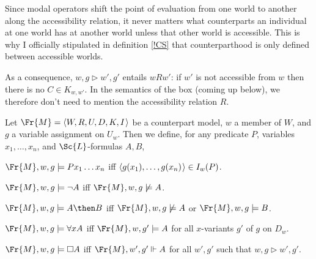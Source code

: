 \documentclass[11pt]{woarticle}
\newcommand{\cmnt}[1]{\iffalse #1 \fi}
\theoremstyle{break}
\theoremstyle{nonumberplain}
\newcommand{\SAT}{\Vdash}
\newcommand{\Img}{\triangleright}
\newcommand{\1}{\;\,|\;\,}
\renewcommand{\t}[1]{\ensuremath{\langle #1  \makebox[.2ex]{}\rangle}}
\begin{document}
\cmnt{%
  Remember that even if no member of $U_w$ has any counterpart at $w'$,
  $K_{w,w'}$ isn't empty: it still contains the empty set. Consequently, there
  will still be a $w'$-image of $V$ at $w$, namely the ``empty'' interpretation
  $V'$ with $V'_{w'}(x)$ undefined for all $x$. This is important e.g.\ for the
  interpretation of $\Box \neg Fx$ or $\Box p$.%
} %

Since modal operators shift the point of evaluation from one world to another
along the accessibility relation, it never matters what counterparts an
individual at one world has at another world unless that other world is
accessible. This is why I officially stipulated in definition \ref{!CS} that
counterparthood is only defined between accessible worlds.

As a consequence, $w,g \Img w',g'$ entails $wRw'$: if $w'$ is not accessible
from $w$ then there is no $C \in K_{w,w'}$. \label{Rredundant} In the semantics
of the box (coming up below), we therefore don't need to mention the
accessibility relation $R$.



\begin{definition}[Satisfaction]{\label{!SAT}}
  Let $\Fr{M} = \t{W,R,U,D,K,I}$ be a counterpart model, $w$ a member of $W$, and
  $g$ a variable assignment on $U_{w}$. Then we define, for any predicate $P$, variables $x_{1},\ldots,x_{n}$, and $\Sc{L}$-formulas $A,B$,
  \begin{semantics}
    \item[$\Fr{M},w,g \models Px_1\ldots x_n$] iff
    $\t{g(x_1),\ldots,g(x_n)} \in I_w(P)$.
    \item[$\Fr{M},w,g \models \neg A$] iff $\Fr{M},w,g \not\models A$.
    \item[$\Fr{M},w,g \models A \then B$] iff $\Fr{M},w,g \not\models A$ or $\Fr{M},w,g \models B$.
    \item[$\Fr{M},w,g \models \forall x A$] iff $\Fr{M},w,g' \models A$ for all
    $x$-variants $g'$ of $g$ on $D_w$.
    \item[$\Fr{M},w,g \models \Box A$] iff $\Fr{M},w',g' \SAT A$ for all
    $w',g'$ such that $w,g \Img w',g'$.
  \end{semantics}
\end{definition}
\end{document}
